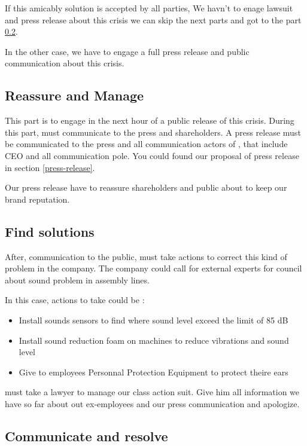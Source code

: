 If this amicably solution is accepted by all parties,  We havn't to enage lawsuit and press release about this crisis we can skip the next parts and got to the part \ref{endpart}.

In the other case, we have to engage a full press release and public communication about this crisis.

\subsection{Reassure and Manage}

This part is to engage in the next hour of a public release of this crisis.
During this part, \moldco must communicate to the press and shareholders.
A press release must be communicated to the press and all communication actors of \moldco, that include \moldco CEO and all communication pole.
You could found our proposal of press release in section \ref{press-release}.

Our press release have to reassure shareholders and public about \moldco to keep our brand reputation.

\subsection{Find solutions}
\label{endpart}

After, communication to the public, \moldco must take actions to correct this kind of problem in the company.
The company could call for external experts for council about sound problem in assembly lines.

In this case, actions to take could be :

\begin{itemize}
\item Install sounds sensors to find where sound level exceed the limit of 85 dB
\item Install sound reduction foam on machines to reduce vibrations and sound level
\item Give to employees Personnal Protection Equipment to protect theire ears
\end{itemize}

\moldco must take a lawyer to manage our class action suit.
Give him all information we have so far about out ex-employees and our press communication and apologize.

\subsection{Communicate and resolve}

